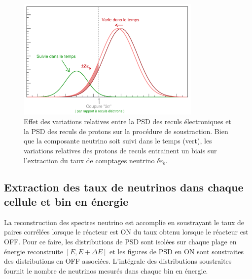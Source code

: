 {\begin{figure}[h!]
\centering
\includegraphics[width=0.8\textwidth]{images/no_cut_on_PSD.png}
\caption[Effet des variations relatives entre la PSD des reculs électroniques et la PSD des reculs de protons sur la procédure de soustraction.]{Effet des variations relatives entre la PSD des reculs électroniques et la PSD des reculs de protons sur la procédure de soustraction. Bien que la composante neutrino soit suivi dans le temps (vert), les variations relatives des protons de reculs entrainent un biais sur l'extraction du taux de comptages neutrino $\delta \varepsilon_b$.}
\label{fig:no_cut_on_PSD.png}
\end{figure}

\clearpage

}




\subsection{Extraction des taux de neutrinos dans chaque cellule et bin en énergie}
\label{sec:nu_extraction}

La reconstruction des spectres neutrino est accomplie en soustrayant le taux de  paires corrélées lorsque le réacteur est ON du taux obtenu lorsque le réacteur est OFF. Pour ce faire, les distributions de PSD sont isolées sur chaque plage en énergie reconstruite $\left[E, E+ \Delta E\right]$ et les figures de PSD en ON sont soustraites des distributions en OFF associées. L'intégrale des distributions soustraites fournit le nombre de neutrinos mesurés dans chaque bin en énergie.\\

